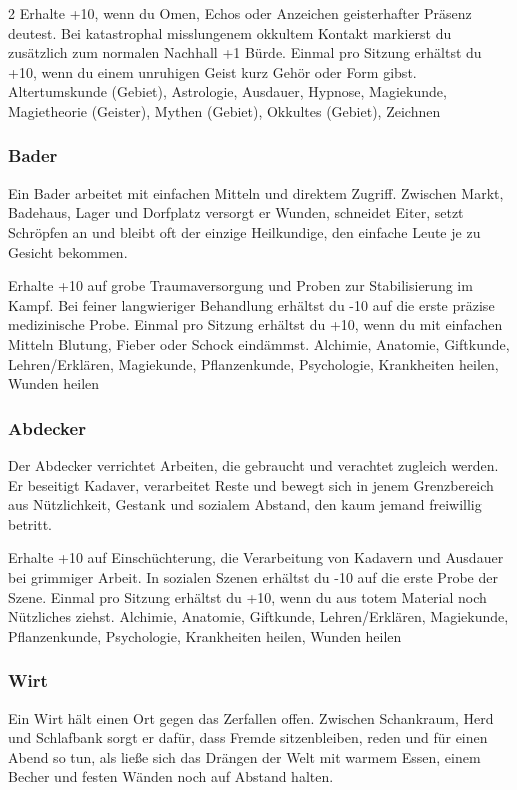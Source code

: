 {\begin{multicols*}{2}
        \wegespielwertebox
        {Erhalte +10, wenn du Omen, Echos oder Anzeichen geisterhafter Präsenz deutest.}
        {Bei katastrophal misslungenem okkultem Kontakt markierst du zusätzlich zum normalen Nachhall +1 Bürde.}
        {Einmal pro Sitzung erhältst du +10, wenn du einem unruhigen Geist kurz Gehör oder Form gibst.}
        {Altertumskunde (Gebiet), Astrologie, Ausdauer, Hypnose, Magiekunde, Magietheorie (Geister), Mythen (Gebiet), Okkultes (Gebiet), Zeichnen}

        \subsubsection*{Bader}
        Ein Bader arbeitet mit einfachen Mitteln und direktem Zugriff. Zwischen Markt, Badehaus, Lager und Dorfplatz versorgt er Wunden, schneidet Eiter, setzt Schröpfen an und bleibt oft der einzige Heilkundige, den einfache Leute je zu Gesicht bekommen.

        \wegespielwertebox
        {Erhalte +10 auf grobe Traumaversorgung und Proben zur Stabilisierung im Kampf.}
        {Bei feiner langwieriger Behandlung erhältst du -10 auf die erste präzise medizinische Probe.}
        {Einmal pro Sitzung erhältst du +10, wenn du mit einfachen Mitteln Blutung, Fieber oder Schock eindämmst.}
        {Alchimie, Anatomie, Giftkunde, Lehren/Erklären, Magiekunde, Pflanzenkunde, Psychologie, Krankheiten heilen, Wunden heilen}

        \subsubsection*{Abdecker}
        Der Abdecker verrichtet Arbeiten, die gebraucht und verachtet zugleich werden. Er beseitigt Kadaver, verarbeitet Reste und bewegt sich in jenem Grenzbereich aus Nützlichkeit, Gestank und sozialem Abstand, den kaum jemand freiwillig betritt.

        \wegespielwertebox
        {Erhalte +10 auf Einschüchterung, die Verarbeitung von Kadavern und Ausdauer bei grimmiger Arbeit.}
        {In sozialen Szenen erhältst du -10 auf die erste Probe der Szene.}
        {Einmal pro Sitzung erhältst du +10, wenn du aus totem Material noch Nützliches ziehst.}
        {Alchimie, Anatomie, Giftkunde, Lehren/Erklären, Magiekunde, Pflanzenkunde, Psychologie, Krankheiten heilen, Wunden heilen}

        \subsubsection*{Wirt}
        Ein Wirt hält einen Ort gegen das Zerfallen offen. Zwischen Schankraum, Herd und Schlafbank sorgt er dafür, dass Fremde sitzenbleiben, reden und für einen Abend so tun, als ließe sich das Drängen der Welt mit warmem Essen, einem Becher und festen Wänden noch auf Abstand halten.


\end{multicols*}}

